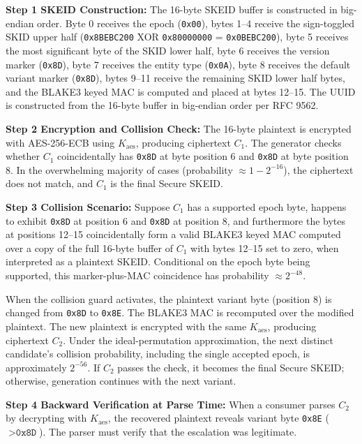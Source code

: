 \documentclass[fleqn,10pt,lineno]{wlpeerj}
\begin{document}
\textbf{Step 1 SKEID Construction:} The 16-byte SKEID buffer is
constructed in big-endian order. Byte 0 receives the epoch
(\texttt{0x00}), bytes 1--4 receive the sign-toggled SKID upper half
(\texttt{0x8BEBC200} XOR \texttt{0x80000000} = \texttt{0x0BEBC200}),
byte 5 receives the most significant byte of the SKID lower half, byte 6
receives the version marker (\texttt{0x8D}), byte 7 receives the entity
type (\texttt{0x0A}), byte 8 receives the default variant marker
(\texttt{0x8D}), bytes 9--11 receive the remaining SKID lower half
bytes, and the BLAKE3 keyed MAC is computed and placed at bytes 12--15.
The UUID is constructed from the 16-byte buffer in big-endian order per
RFC 9562.

\textbf{Step 2 Encryption and Collision Check:} The 16-byte plaintext is
encrypted with AES-256-ECB using \(K_{\mathrm{aes}}\), producing
ciphertext \(C_1\). The generator checks whether \(C_1\) coincidentally
has \texttt{0x8D} at byte position 6 and \texttt{0x8D} at byte position
8. In the overwhelming majority of cases (probability
\(\approx 1 - 2^{-16}\)), the ciphertext does not match, and \(C_1\) is
the final Secure SKEID.

\textbf{Step 3 Collision Scenario:} Suppose \(C_1\) has a supported
epoch byte, happens to exhibit \texttt{0x8D} at position 6 and
\texttt{0x8D} at position 8, and furthermore the bytes at positions
12--15 coincidentally form a valid BLAKE3 keyed MAC computed over a copy
of the full 16-byte buffer of \(C_1\) with bytes 12--15 set to zero,
when interpreted as a plaintext SKEID. Conditional on the epoch byte
being supported, this marker-plus-MAC coincidence has probability
\(\approx 2^{-48}\).

When the collision guard activates, the plaintext variant byte (position
8) is changed from \texttt{0x8D} to \texttt{0x8E}. The BLAKE3 MAC is
recomputed over the modified plaintext. The new plaintext is encrypted
with the same \(K_{\mathrm{aes}}\), producing ciphertext \(C_2\). Under
the ideal-permutation approximation, the next distinct candidate's
collision probability, including the single accepted epoch, is
approximately \(2^{-56}\). If \(C_2\) passes the check, it becomes the
final Secure SKEID; otherwise, generation continues with the next
variant.

\textbf{Step 4 Backward Verification at Parse Time:} When a consumer
parses \(C_2\) by decrypting with \(K_{\mathrm{aes}}\), the recovered
plaintext reveals variant byte \texttt{0x8E} (\(> \texttt{0x8D}\)). The
parser must verify that the escalation was legitimate.
\end{document}
